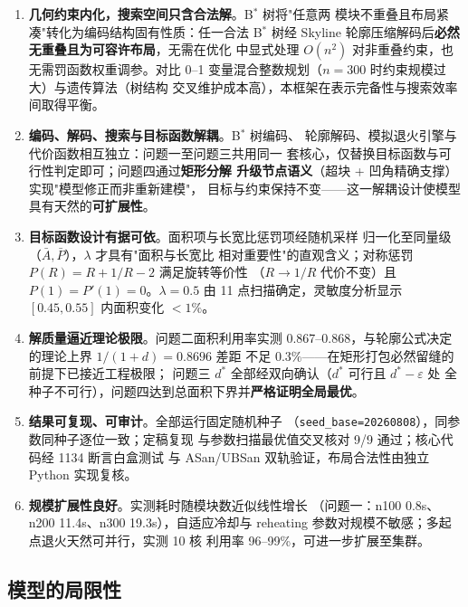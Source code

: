 \documentclass[12pt,a4paper]{article}
\begin{document}
\begin{enumerate}[leftmargin=2em]
    \item \textbf{几何约束内化，搜索空间只含合法解}。B$^*$ 树将"任意两
    模块不重叠且布局紧凑"转化为编码结构固有性质：任一合法 B$^*$ 树经
    Skyline 轮廓压缩解码后\textbf{必然无重叠且为可容许布局}，无需在优化
    中显式处理 $O(n^2)$ 对非重叠约束，也无需罚函数权重调参。对比
    0--1 变量混合整数规划（$n=300$ 时约束规模过大）与遗传算法（树结构
    交叉维护成本高），本框架在表示完备性与搜索效率间取得平衡。

    \item \textbf{编码、解码、搜索与目标函数解耦}。B$^*$ 树编码、
    轮廓解码、模拟退火引擎与代价函数相互独立：问题一至问题三共用同一
    套核心，仅替换目标函数与可行性判定即可；问题四通过\textbf{矩形分解
    升级节点语义}（超块 + 凹角精确支撑）实现"模型修正而非重新建模"，
    目标与约束保持不变——这一解耦设计使模型具有天然的\textbf{可扩展性}。

    \item \textbf{目标函数设计有据可依}。面积项与长宽比惩罚项经随机采样
    归一化至同量级（$\bar A, \bar P$），$\lambda$ 才具有"面积与长宽比
    相对重要性"的直观含义；对称惩罚 $P(R)=R+1/R-2$ 满足旋转等价性
    （$R \to 1/R$ 代价不变）且 $P(1)=P'(1)=0$。$\lambda=0.5$ 由
    11 点扫描确定，灵敏度分析显示 $[0.45, 0.55]$ 内面积变化 $<1\%$。

    \item \textbf{解质量逼近理论极限}。问题二面积利用率实测
    0.867--0.868，与轮廓公式决定的理论上界 $1/(1+d)=0.8696$ 差距
    不足 $0.3\%$——在矩形打包必然留缝的前提下已接近工程极限；
    问题三 $d^*$ 全部经双向确认（$d^*$ 可行且 $d^*-\varepsilon$ 处
    全种子不可行），问题四达到总面积下界并\textbf{严格证明全局最优}。

    \item \textbf{结果可复现、可审计}。全部运行固定随机种子
    （\texttt{seed\_base=20260808}），同参数同种子逐位一致；定稿复现
    与参数扫描最优值交叉核对 9/9 通过；核心代码经 1134 断言白盒测试
    与 ASan/UBSan 双轨验证，布局合法性由独立 Python 实现复核。

    \item \textbf{规模扩展性良好}。实测耗时随模块数近似线性增长
    （问题一：n100 0.8s、n200 11.4s、n300 19.3s），自适应冷却与
    reheating 参数对规模不敏感；多起点退火天然可并行，实测 10 核
    利用率 96--99\%，可进一步扩展至集群。
\end{enumerate}

\subsection{模型的局限性}
\end{document}
